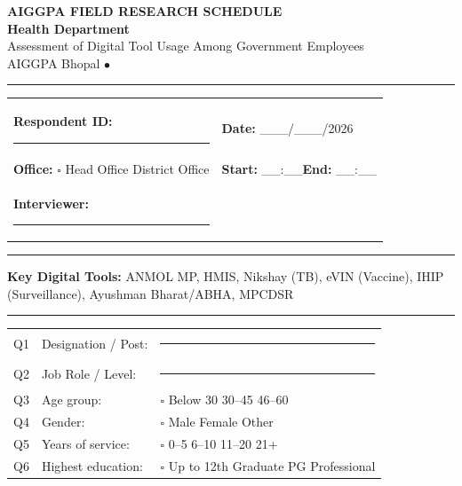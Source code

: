 \documentclass[10pt,a4paper]{article}
\newcommand{\blank}{\rule{8cm}{0.4pt}}
\begin{document}
\begin{center}
{\Large\bfseries AIGGPA FIELD RESEARCH SCHEDULE}\\[3pt]
{\large\bfseries Health Department}\\[3pt]
{\small Assessment of Digital Tool Usage Among Government Employees}\\[2pt]
{\small AIGGPA Bhopal \quad$\bullet$}
\end{center}
\vspace{4pt}\noindent\rule{\textwidth}{1pt}\vspace{4pt}
\noindent\begin{tabularx}{\textwidth}{@{}L{7cm} L{7cm}@{}}
\textbf{Respondent ID:} \blank & \textbf{Date:} \_\_\_/\_\_\_/2026 \\[3pt]
\textbf{Office:} {\Large$\square$} Head Office\quad{\Large$\square$} District Office & \textbf{Start:} \_\_:\_\_\quad\textbf{End:} \_\_:\_\_ \\[3pt]
\textbf{Interviewer:} \blank & \\
\end{tabularx}
\vspace{4pt}\noindent\rule{\textwidth}{0.5pt}\vspace{4pt}

\noindent\textbf{Key Digital Tools:} ANMOL MP, HMIS, Nikshay (TB), eVIN (Vaccine), IHIP (Surveillance), Ayushman Bharat/ABHA, MPCDSR

\vspace{3pt}

\vspace{4pt}\noindent\rule{\textwidth}{0.5pt}

\vspace{3pt}
\vspace{4pt}

\noindent\begin{tabularx}{\textwidth}{@{}L{0.6cm} L{7.5cm} X@{}}
Q1 & Designation / Post: & \blank \\[3pt]
Q2 & Job Role / Level: & \blank \\[3pt]
Q3 & Age group: & {\Large$\square$} Below 30\quad{\Large$\square$} 30--45\quad{\Large$\square$} 46--60 \\[3pt]
Q4 & Gender: & {\Large$\square$} Male\quad{\Large$\square$} Female\quad{\Large$\square$} Other \\[3pt]
Q5 & Years of service: & {\Large$\square$} 0--5\quad{\Large$\square$} 6--10\quad{\Large$\square$} 11--20\quad{\Large$\square$} 21+ \\[3pt]
Q6 & Highest education: & {\Large$\square$} Up to 12th\quad{\Large$\square$} Graduate\quad{\Large$\square$} PG\quad{\Large$\square$} Professional \\
\end{tabularx}
\end{document}
